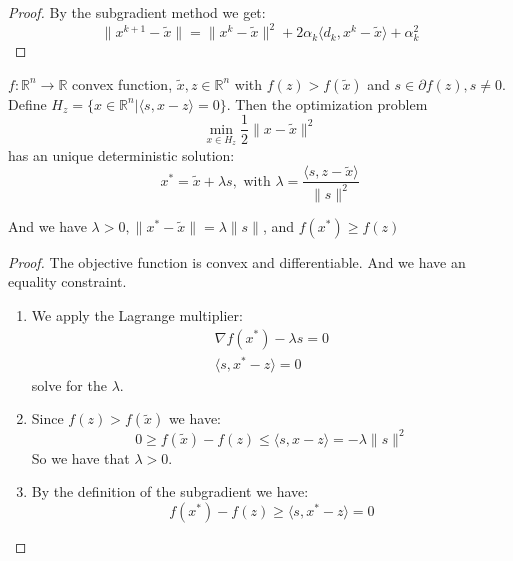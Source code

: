 \begin{proof}
	By the subgradient method we get:
	\begin{equation*}
		\| x^{k+1} - \tilde{x} \| = \| x^k - \tilde{x} \|^2 + 2 \alpha_k \langle d_k, x^k - \tilde{x} \rangle + \alpha_k^2
	\end{equation*}
\end{proof}

\begin{lemma}
	$f : \mathbb{R}^n \longrightarrow \mathbb{R}$ convex function, $\tilde{x}, z \in \mathbb{R}^n$ with $f(z) > f(\tilde{x})$ and $s \in \partial f(z), s \neq 0$. Define $H_z = \{ x \in \mathbb{R}^n | \langle s, x - z \rangle = 0\}$. 
	Then the optimization problem
		\begin{equation*}
			\min_{x \in H_z} \frac{1}{2} \| x - \tilde{x} \|^2
		\end{equation*}
		has an unique deterministic solution:
		\begin{equation*}
			x^* = \tilde{x} + \lambda s, \text{  with } \lambda = \frac{\langle s,  z - \tilde{x} \rangle}{\| s\|^2}
		\end{equation*}
		
		And we have $\lambda > 0, \|x^* - \tilde{x} \| = \lambda \|s\|$, and $f(x^*) \geq f(z)$
\end{lemma}

\begin{proof}
	The objective function is convex and differentiable. And we have an equality constraint.
	\begin{enumerate}
		\item We apply the Lagrange multiplier:
			\begin{align*}
				\nabla f(x^*) - \lambda s = 0\\
				\langle s, x^* - z \rangle = 0
			\end{align*}
			solve for the $\lambda$.
		\item Since $f(z) > f(\tilde{x})$ we have:
			\begin{equation*}
				0 \geq f(\tilde{x}) - f(z) \leq \langle s, x - z \rangle = - \lambda \|s\|^2
			\end{equation*}
			So we have that $\lambda > 0$.
		\item By the definition of the subgradient we have:
			\begin{equation*}
				f(x^*) - f(z) \geq \langle s, x^* - z \rangle = 0
			\end{equation*}
	\end{enumerate}
\end{proof}

